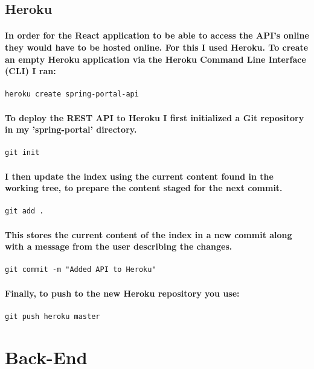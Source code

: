 \subsection{Heroku}
\paragraph{In order for the React application to be able to access the API's online they would have to be hosted online. For this I used Heroku. To create an empty Heroku application via the Heroku Command Line Interface (CLI) I ran:}
\begin{verbatim}
heroku create spring-portal-api
\end{verbatim}
\paragraph{To deploy the REST API to Heroku I first initialized a Git repository in my 'spring-portal' directory.}
\begin{verbatim}
git init
\end{verbatim}
\paragraph{I then update the index using the current content found in the working tree, to prepare the content staged for the next commit.}
\begin{verbatim}
git add .
\end{verbatim}
\paragraph{This stores the current content of the index in a new commit along with a message from the user describing the changes.}
\begin{verbatim}
git commit -m "Added API to Heroku"
\end{verbatim}
\paragraph{Finally, to push to the new Heroku repository you use:}
\begin{verbatim}
git push heroku master
\end{verbatim}

\section{Back-End}
\subsection{}
